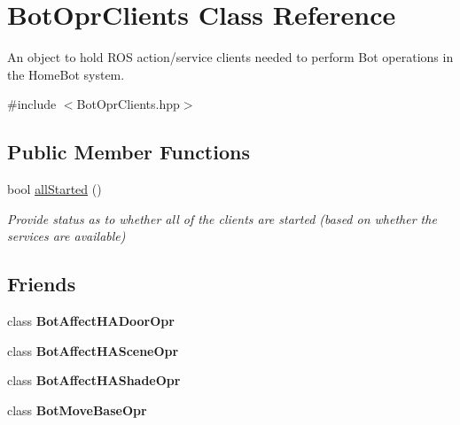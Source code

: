 \hypertarget{classBotOprClients}{\section{Bot\-Opr\-Clients Class Reference}
\label{classBotOprClients}
}


An object to hold R\-O\-S action/service clients needed to perform Bot operations in the Home\-Bot system.  




{\ttfamily \#include $<$Bot\-Opr\-Clients.\-hpp$>$}

\subsection*{Public Member Functions}
\begin{DoxyCompactItemize}
\item 
bool \hyperlink{classBotOprClients_a391df41704d4984c1c757c4e095a5fe7}{all\-Started} ()
\begin{DoxyCompactList}\small\item\em Provide status as to whether all of the clients are started (based on whether the services are available) \end{DoxyCompactList}\end{DoxyCompactItemize}
\subsection*{Friends}
\begin{DoxyCompactItemize}
\item 
\hypertarget{classBotOprClients_a444222e47c36e1fec1177b4946f76f31}{class {\bfseries Bot\-Affect\-H\-A\-Door\-Opr}}\label{classBotOprClients_a444222e47c36e1fec1177b4946f76f31}

\item 
\hypertarget{classBotOprClients_a108beaf6fe53a7d3162abe84d250afb9}{class {\bfseries Bot\-Affect\-H\-A\-Scene\-Opr}}\label{classBotOprClients_a108beaf6fe53a7d3162abe84d250afb9}

\item 
\hypertarget{classBotOprClients_a2d3857a8b4a125e0df8733287d8d2389}{class {\bfseries Bot\-Affect\-H\-A\-Shade\-Opr}}\label{classBotOprClients_a2d3857a8b4a125e0df8733287d8d2389}

\item 
\hypertarget{classBotOprClients_a324bf0c7a27336fae9ab3694050e41c6}{class {\bfseries Bot\-Move\-Base\-Opr}}\label{classBotOprClients_a324bf0c7a27336fae9ab3694050e41c6}

\end{DoxyCompactItemize}


